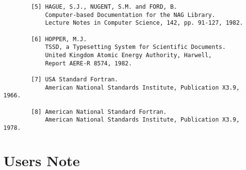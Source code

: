 \begin{small}
\begin{verbatim}
        [5] HAGUE, S.J., NUGENT, S.M. and FORD, B.                                
            Computer-based Documentation for the NAG Library.                     
            Lecture Notes in Computer Science, 142, pp. 91-127, 1982.             
                                                                                  
        [6] HOPPER, M.J.                                                          
            TSSD, a Typesetting System for Scientific Documents.                  
            United Kingdom Atomic Energy Authority, Harwell,                      
            Report AERE-R 8574, 1982.                                             
                                                                                  
        [7] USA Standard Fortran.                                                 
            American National Standards Institute, Publication X3.9, 1966.        
                                                                                  
        [8] American National Standard Fortran.                                   
            American National Standards Institute, Publication X3.9, 1978.        
\end{verbatim}
\end{small}

\newpage
\section{Users Note}
\label{se:usern}

